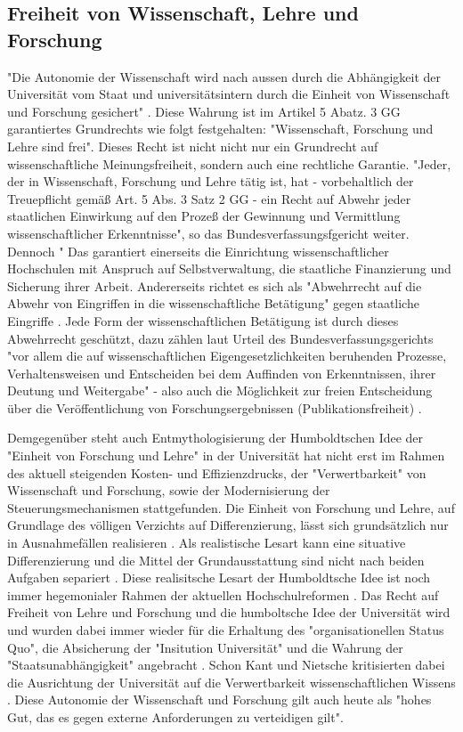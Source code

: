 \subsection{Freiheit von Wissenschaft, Lehre und Forschung}

"Die Autonomie der Wissenschaft wird nach aussen durch die Abhängigkeit der Universität vom Staat und universitätsintern durch die Einheit von Wissenschaft und Forschung gesichert" \cite{Huber_2005}. Diese Wahrung ist im Artikel 5 Abatz. 3 GG garantiertes Grundrechts wie folgt festgehalten: "Wissenschaft, Forschung und Lehre sind frei". Dieses Recht ist nicht nicht nur ein Grundrecht auf wissenschaftliche Meinungsfreiheit, sondern auch eine rechtliche Garantie. "Jeder, der in Wissenschaft, Forschung und Lehre tätig ist, hat - vorbehaltlich der Treuepflicht gemäß Art. 5 Abs. 3 Satz 2 GG - ein Recht auf Abwehr jeder staatlichen Einwirkung auf den Prozeß der Gewinnung und Vermittlung wissenschaftlicher Erkenntnisse", so das Bundesverfassungsfgericht weiter. Dennoch " Das garantiert einerseits die Einrichtung wissenschaftlicher Hochschulen mit Anspruch auf Selbstverwaltung, die staatliche Finanzierung und Sicherung ihrer Arbeit. Andererseits richtet es sich als "Abwehrrecht auf die Abwehr von Eingriffen in die wissenschaftliche Betätigung" gegen staatliche Eingriffe \cite{mayen_grundrechte_forscher} \cite{spindler_2006_rechtloa}. Jede Form der wissenschaftlichen Betätigung ist durch dieses Abwehrrecht geschützt, dazu zählen laut Urteil des Bundesverfassungsgerichts "vor allem die auf wissenschaftlichen Eigengesetzlichkeiten beruhenden Prozesse, Verhaltensweisen und Entscheiden bei dem Auffinden von Erkenntnissen, ihrer Deutung und Weitergabe" - also auch die Möglichkeit zur freien Entscheidung über die Veröffentlichung von Forschungsergebnissen (Publikationsfreiheit) \cite{Fangerau_2014}.

Demgegenüber steht auch Entmythologisierung der Humboldtschen Idee der "Einheit von Forschung und Lehre" in der Universität hat nicht erst im Rahmen des aktuell steigenden Kosten- und Effizienzdrucks, der "Verwertbarkeit" von Wissenschaft und Forschung, sowie der Modernisierung der Steuerungsmechanismen stattgefunden. Die Einheit von Forschung und Lehre, auf Grundlage des völligen Verzichts auf Differenzierung, lässt sich grundsätzlich nur in Ausnahmefällen realisieren \cite{Schimank_2001}. Als realistische Lesart kann eine situative Differenzierung und die Mittel der Grundausstattung sind nicht nach beiden Aufgaben separiert \cite{Schimank_2001}. Diese realisitsche Lesart der Humboldtsche Idee ist noch immer hegemonialer Rahmen der aktuellen Hochschulreformen \cite{Huber_2005}. Das Recht auf Freiheit von Lehre und Forschung und die humboltsche Idee der Universität wird und wurden dabei immer wieder für die Erhaltung des "organisationellen Status Quo", die Absicherung der "Insitution Universität" und die Wahrung der "Staatsunabhängigkeit" angebracht \cite{Huber_2005}. Schon Kant und Nietsche kritisierten dabei die Ausrichtung der Universität auf die Verwertbarkeit wissenschaftlichen Wissens \cite{Huber_2005}. Diese Autonomie der Wissenschaft und Forschung gilt auch heute als "hohes Gut, das es gegen externe Anforderungen zu verteidigen gilt"\cite{kaldewey_2010}.

